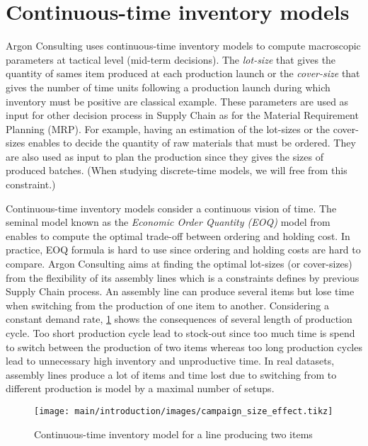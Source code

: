 \section{Continuous-time inventory models}
\label{sec:intro:en:continuous-time-inventory-models}


Argon Consulting uses continuous-time inventory models to compute macroscopic parameters at tactical level (mid-term decisions).
The \emph{lot-size} that gives the quantity of sames item produced at each production launch or the \emph{cover-size} that gives the number of time units following a production launch during which inventory must be positive are classical example.
These parameters are used as input for other decision process in Supply Chain as for the Material Requirement Planning (MRP).
For example, having an estimation of the lot-sizes or the cover-sizes enables to decide the quantity of raw materials that must be ordered.
They are also used as input to plan the production since they gives the sizes of produced batches.
(When studying discrete-time models, we will free from this constraint.)


Continuous-time inventory models consider a continuous vision of time.
The seminal model known as the \emph{Economic Order Quantity (EOQ)} model from \citet{Harris1913} enables to compute the optimal trade-off between ordering and holding cost.
In practice, EOQ formula is hard to use since ordering and holding costs are hard to compare.
Argon Consulting aims at finding the optimal lot-sizes (or cover-sizes) from the flexibility of its assembly lines which is a constraints defines by previous Supply Chain process.
An assembly line can produce several items but lose time when switching from the production of one item to another.
Considering a constant demand rate, \cref{fig:intro:en:continuous-time-inventory-model} shows the consequences of several length of production cycle.
Too short production cycle lead to stock-out since too much time is spend to switch between the production of two items whereas too long production cycles lead to unnecessary high inventory and unproductive time.
In real datasets, assembly lines produce a lot of items and time lost due to switching from to different production is model by a maximal number of setups.


\begin{figure}[!ht]
  \centering
  \texttt{[image: main/introduction/images/campaign\_size\_effect.tikz]}
  \caption{Continuous-time inventory model for a line producing two items}
  \label{fig:intro:en:continuous-time-inventory-model}
\end{figure}



